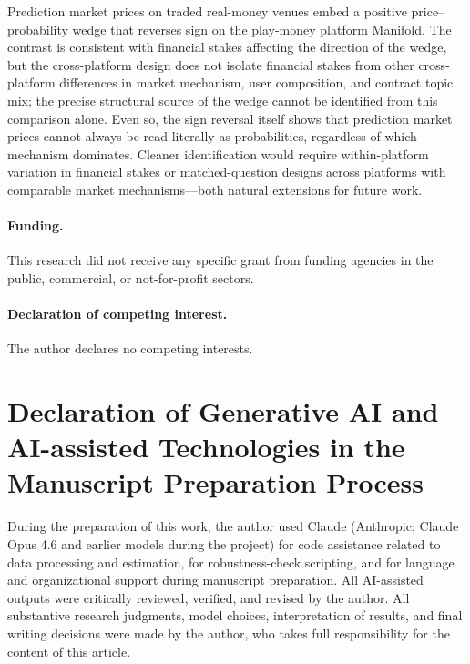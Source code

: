 \documentclass[12pt]{article}
\begin{document}
Prediction market prices on traded real-money venues embed a positive price--probability wedge that reverses sign on the play-money platform Manifold. The contrast is consistent with financial stakes affecting the direction of the wedge, but the cross-platform design does not isolate financial stakes from other cross-platform differences in market mechanism, user composition, and contract topic mix; the precise structural source of the wedge cannot be identified from this comparison alone. Even so, the sign reversal itself shows that prediction market prices cannot always be read literally as probabilities, regardless of which mechanism dominates. Cleaner identification would require within-platform variation in financial stakes or matched-question designs across platforms with comparable market mechanisms---both natural extensions for future work.

\paragraph{Funding.} This research did not receive any specific grant from funding agencies in the public, commercial, or not-for-profit sectors.

\paragraph{Declaration of competing interest.} The author declares no competing interests.

\section*{Declaration of Generative AI and AI-assisted Technologies in the Manuscript Preparation Process}

During the preparation of this work, the author used Claude (Anthropic; Claude Opus 4.6 and earlier models during the project) for code assistance related to data processing and estimation, for robustness-check scripting, and for language and organizational support during manuscript preparation. All AI-assisted outputs were critically reviewed, verified, and revised by the author. All substantive research judgments, model choices, interpretation of results, and final writing decisions were made by the author, who takes full responsibility for the content of this article.
\end{document}
